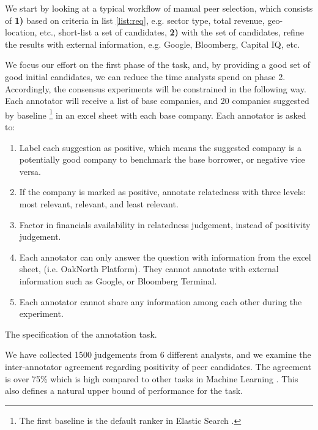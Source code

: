 \documentclass[]{article}
\begin{document}
We start by looking at a typical workflow of manual peer selection, which 
consists of \textbf{1)} based on criteria in list \ref{list:req}, 
e.g. sector type, total revenue, geo-location, etc., short-list a set of 
candidates, \textbf{2)} with the set of candidates, refine the results with 
external information, e.g. Google, Bloomberg, Capital IQ, etc.

We focus our effort on the first phase of the task, and, by providing a good 
set of good initial candidates, we can reduce the time analysts spend on phase 
2. Accordingly, the consensus experiments will be constrained in the following 
way. Each annotator will receive a list of base companies, and 20 companies 
suggested by baseline \footnote{The first baseline is the default ranker in 
Elastic Search \cite{es}.} in an excel sheet with each base company. Each 
annotator is asked to:
\begin{mylist}[H]
    \begin{enumerate}
        \item Label each suggestion as positive, which means the suggested 
        company is a potentially good company to benchmark the base borrower, 
        or negative vice versa.
        
        \item If the company is marked as positive, annotate relatedness with 
        three levels: most relevant, relevant, and least relevant.
        
        \item Factor in financials availability in relatedness 
        judgement, instead of positivity judgement. 
        
        \item Each annotator can only answer the question with information from 
        the excel sheet, (i.e. OakNorth Platform). They cannot annotate with 
        external information such as Google, or Bloomberg Terminal.
        
        \item Each annotator cannot share any information among each other 
        during the experiment.
        
    \end{enumerate}
\caption{The specification of the annotation task.\label{list:annotation}}
\end{mylist}

We have collected 1500 judgements from 6 different analysts, and we 
examine the inter-annotator agreement regarding positivity of peer candidates. 
The agreement is over 75\% which is high compared to other tasks in Machine 
Learning \cite{mozetivc2016multilingual,nowak2010reliable}. This also defines a 
natural upper bound of performance for the task.
\end{document}

